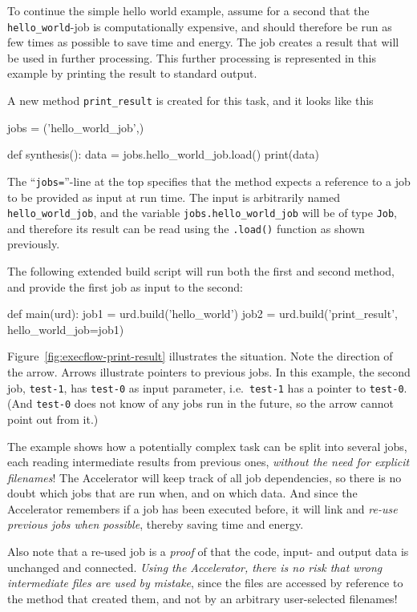 To continue the simple hello world example, assume for a second that
the \texttt{hello\_world}-job is computationally expensive, and should
therefore be run as few times as possible to save time and energy.
The job creates a result that will be used in further processing.
This further processing is represented in this example by printing the
result to standard output.

\clearpage

\noindent A new method \texttt{print\_result} is
created for this task, and it looks like this
\begin{python}
jobs = ('hello_world_job',)

def synthesis():
    data = jobs.hello_world_job.load()
    print(data)
\end{python}
The ``\texttt{jobs=}''-line at the top specifies that the method
expects a reference to a job to be provided as input at run time.  The
input is arbitrarily named \texttt{hello\_world\_job}, and the
variable \texttt{jobs.hello\_world\_job} will be of type \texttt{Job}, and
therefore its result can be read using the \texttt{.load()} function
as shown previously.

The following extended build script will run both the first and second
method, and provide the first job as input to the second:
\begin{python}
def main(urd):
    job1 = urd.build('hello_world')
    job2 = urd.build('print_result', hello_world_job=job1)
\end{python}

Figure~\ref{fig:execflow-print-result} illustrates the situation.
Note the direction of the arrow.  Arrows illustrate pointers to
previous jobs.  In this example, the second job, \texttt{test-1}, has
\texttt{test-0} as input parameter, i.e.\ \texttt{test-1} has a
pointer to \texttt{test-0}.  (And \texttt{test-0} does not know of any
jobs run in the future, so the arrow cannot point out from it.)

The example shows how a potentially complex task can be split into
several jobs, each reading intermediate results from previous ones,
\emph{without the need for explicit filenames}!  The Accelerator will
keep track of all job dependencies, so there is no doubt which jobs
that are run when, and on which data.  And since the Accelerator
remembers if a job has been executed before, it will link and
\emph{re-use previous jobs when possible}, thereby saving time and
energy.

Also note that a re-used job is a \emph{proof} of that the code,
input- and output data is unchanged and connected.  \emph{Using the
Accelerator, there is no risk that wrong intermediate files are used
by mistake}, since the files are accessed by reference to the method
that created them, and not by an arbitrary user-selected filenames!


